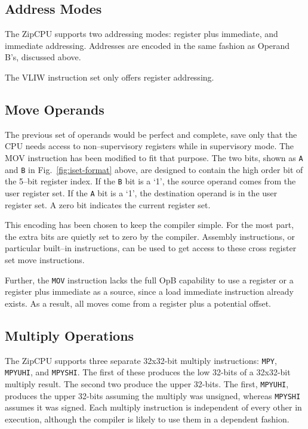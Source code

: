 \documentclass{gqtekspec}
\begin{document}
\subsection{Address Modes}\label{sec:isa-addr}
The ZipCPU supports two addressing modes: register plus immediate, and
immediate addressing.  Addresses are encoded in the same fashion as
Operand B's, discussed above. 

The VLIW instruction set only offers register addressing.

\subsection{Move Operands}\label{sec:isa-mov}
The previous set of operands would be perfect and complete, save only that the
CPU needs access to non--supervisory registers while in supervisory mode.  The
MOV instruction has been modified to fit that purpose.  The two bits,
shown as {\tt A} and {\tt B} in Fig.~\ref{fig:iset-format} above, are designed
to contain the high order bit of the 5--bit register index.  If the {\tt B}
bit is a `1', the source operand comes from the user register set.  If the
{\tt A} bit is a `1', the destination operand is in the user register set.  A
zero bit indicates the current register set.

This encoding has been chosen to keep the compiler simple.  For the most part,
the extra bits are quietly set to zero by the compiler.  Assembly instructions,
or particular built--in instructions, can be used to get access to these
cross register set move instructions.

Further, the {\tt MOV} instruction lacks the full OpB capability to use a
register or a register plus immediate as a source, since a load immediate
instruction already exists.  As a result, all moves come from a register plus a 
potential offset.

\subsection{Multiply Operations}\label{sec:isa-mpy}

The ZipCPU supports three separate 32x32-bit multiply
instructions: {\tt MPY}, {\tt MPYUHI}, and {\tt MPYSHI}.  The first of these
produces the low 32-bits of a 32x32-bit multiply result.  The second two
produce the upper 32-bits.  The first, {\tt MPYUHI}, produces the upper 32-bits
assuming the multiply was unsigned, whereas {\tt MPYSHI} assumes it was signed.
Each multiply instruction is independent of every other in execution, although
the compiler is likely to use them in a dependent fashion.
\end{document}
